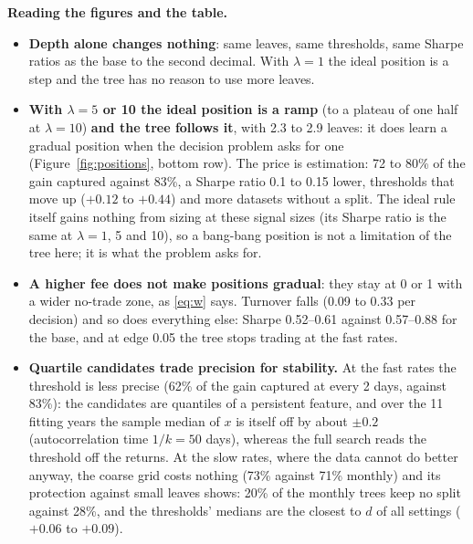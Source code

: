 \documentclass[11pt,a4paper]{article}
\newcommand{\1}{\mathbf{1}}
\begin{document}
\textbf{Reading the figures and the table.}
\begin{itemize}\setlength{\itemsep}{1pt}
\item \textbf{Depth alone changes nothing}: same leaves, same thresholds, same Sharpe ratios as the base to the second decimal. With $\lambda=1$ the ideal position is a step and the tree has no reason to use more leaves.
\item \textbf{With $\lambda=5$ or 10 the ideal position is a ramp} (to a plateau of one half at $\lambda=10$) \textbf{and the tree follows it}, with 2.3 to 2.9 leaves: it does learn a gradual position when the decision problem asks for one (Figure~\ref{fig:positions}, bottom row). The price is estimation: 72 to 80\% of the gain captured against 83\%, a Sharpe ratio 0.1 to 0.15 lower, thresholds that move up ($+0.12$ to $+0.44$) and more datasets without a split. The ideal rule itself gains nothing from sizing at these signal sizes (its Sharpe ratio is the same at $\lambda=1$, 5 and 10), so a bang-bang position is not a limitation of the tree here; it is what the problem asks for.
\item \textbf{A higher fee does not make positions gradual}: they stay at 0 or 1 with a wider no-trade zone, as \eqref{eq:w} says. Turnover falls (0.09 to 0.33 per decision) and so does everything else: Sharpe 0.52--0.61 against 0.57--0.88 for the base, and at edge 0.05 the tree stops trading at the fast rates.
\item \textbf{Quartile candidates trade precision for stability.} At the fast rates the threshold is less precise (62\% of the gain captured at every 2 days, against 83\%): the candidates are quantiles of a persistent feature, and over the 11 fitting years the sample median of $x$ is itself off by about $\pm0.2$ (autocorrelation time $1/k=50$ days), whereas the full search reads the threshold off the returns. At the slow rates, where the data cannot do better anyway, the coarse grid costs nothing (73\% against 71\% monthly) and its protection against small leaves shows: 20\% of the monthly trees keep no split against 28\%, and the thresholds' medians are the closest to $d$ of all settings ($+0.06$ to $+0.09$).
\end{itemize}
\end{document}
